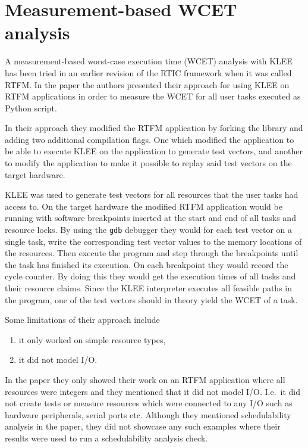 \section{Measurement-based WCET analysis}
A measurement-based worst-case execution time (WCET) analysis with KLEE has
been tried in an earlier revision of the RTIC framework when it was called
RTFM\cite{lindner}. In the paper the authors presented their approach for using
KLEE on RTFM applications in order to measure the WCET for all user tasks
executed as Python script.

In their approach they modified the RTFM application by forking the library and
adding two additional compilation flags. One which modified the application to be
able to execute KLEE on the application to generate test vectors, and another
to modify the application to make it possible to replay said test vectors on
the target hardware.

KLEE was used to generate test vectors for all resources that the user tasks
had access to. On the target hardware the modified RTFM application would be
running with software breakpoints inserted at the start and end of all tasks
and resource locks. By using the \texttt{gdb} debugger they would for each test
vector on a single task, write the corresponding test vector values to the
memory locations of the resources. Then execute the program and step through the
breakpoints until the task has finished its execution. On each breakpoint
they would record the cycle counter. By doing this they would get the execution
times of all tasks and their resource claims. Since the KLEE interpreter
executes all feasible paths in the program, one of the test vectors should
in theory yield the WCET of a task.

Some limitations of their approach include
\begin{enumerate}
    \item it only worked on simple resource types,
    \item it did not model I/O.
\end{enumerate}
In the paper they only showed their work on an RTFM application where all
resources were integers and they mentioned that it did not model I/O. I.e.\
it did not create tests or measure resources which were connected to any I/O
such as hardware peripherals, serial ports etc. Although they mentioned
schedulability analysis in the paper, they did not showcase any such examples
where their results were used to run a schedulability analysis check.

